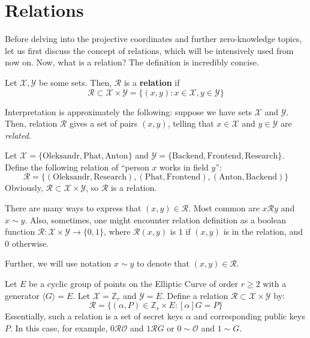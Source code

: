 \documentclass[../lecture-notes.tex]{subfiles}
\begin{document}
\section{Relations}

Before delving into the projective coordinates and further zero-knowledge topics, let us first discuss the concept of relations, which will be intensively used from now on. Now, what is a relation? The definition is incredibly concise.

\begin{definition}
    Let $\mathcal{X},\mathcal{Y}$ be some sets. Then, $\mathcal{R}$ is a \textbf{relation} if 
    \begin{equation}
        \mathcal{R} \subset \mathcal{X} \times \mathcal{Y} = \{(x,y): x \in \mathcal{X}, y \in \mathcal{Y}\}
    \end{equation}
\end{definition}

Interpretation is approximately the following: suppose we have sets $\mathcal{X}$ and $\mathcal{Y}$. Then, relation $\mathcal{R}$ gives a set of pairs $(x,y)$, telling that $x \in \mathcal{X}$ and $y \in \mathcal{Y}$ are \textit{related}.

\begin{example}
    Let $\mathcal{X} = \{\text{Oleksandr}, \text{Phat}, \text{Anton}\}$ and $\mathcal{Y} = \{\text{Backend}, \text{Frontend}, \text{Research}\}$. Define the following relation of ``person $x$ works in field $y$'':
    \begin{equation}
        \mathcal{R} = \{(\text{Oleksandr}, \text{Research}), (\text{Phat}, \text{Frontend}), (\text{Anton}, \text{Backend})\}
    \end{equation}
    Obviously, $\mathcal{R} \subset \mathcal{X} \times \mathcal{Y}$, so $\mathcal{R}$ is a relation.
\end{example}

\begin{remark}
    There are many ways to express that $(x,y) \in \mathcal{R}$. Most common are $x \mathcal{R} y$ and $x \sim y$. Also, sometimes, one might encounter relation definition as a boolean function $\mathcal{R}: \mathcal{X} \times \mathcal{Y} \to \{0,1\}$, where $\mathcal{R}(x,y)$ is $1$ if $(x,y)$ is in the relation, and $0$ otherwise.

    Further, we will use notation $x \sim y$ to denote that $(x,y) \in \mathcal{R}$.
\end{remark}

\begin{example}
    Let $E$ be a cyclic group of points on the Elliptic Curve of order $r \geq 2$ with a generator $\langle G \rangle = E$. Let $\mathcal{X} = \mathbb{Z}_r$ and $\mathcal{Y} = E$. Define a relation $\mathcal{R} \subset \mathcal{X} \times \mathcal{Y}$ by:
    \begin{equation}
        \mathcal{R} = \{(\alpha, P) \in \mathbb{Z}_r \times E: [\alpha]G = P\}
    \end{equation}
    Essentially, such a relation is a set of secret keys $\alpha$ and corresponding public keys $P$. In this case, for example, $0\mathcal{R}\mathcal{O}$ and $1\mathcal{R}G$ or $0 \sim \mathcal{O}$ and $1 \sim G$.
\end{example}
\end{document}
